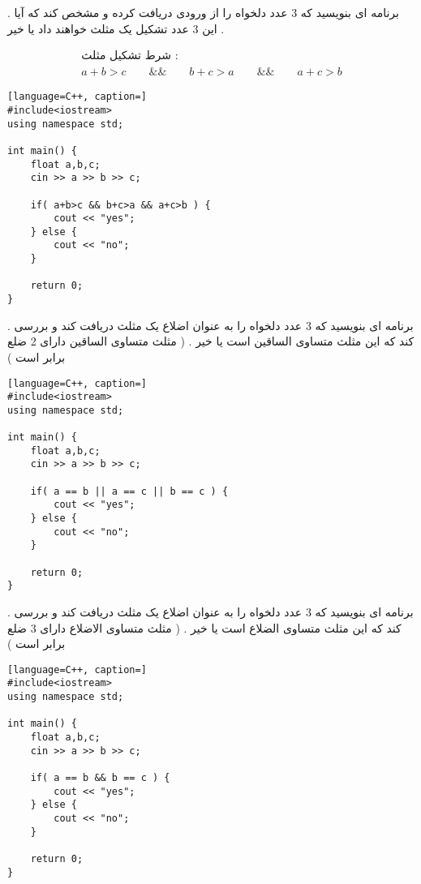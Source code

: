 \documentclass[12pt]{article}
\begin{document}
\newpage

 . برنامه ای بنویسید که 3 عدد دلخواه را از ورودی دریافت کرده و مشخص کند که آیا این 3 عدد تشکیل یک مثلث خواهند داد یا خیر .



\begin{align*}
\text{شرط تشکیل مثلث : } \\ 
a+b>c \qquad \&\& \qquad b+c>a \qquad \&\& \qquad a+c>b
\end{align*}




\begin{latin}
\begin{lstlisting}[language=C++, caption=]
#include<iostream>
using namespace std;

int main() {
	float a,b,c;
	cin >> a >> b >> c;
	
	if( a+b>c && b+c>a && a+c>b ) {
		cout << "yes";
	} else {
		cout << "no";
	}
	
	return 0;
}
\end{lstlisting}
\end{latin}




\newpage

 . برنامه ای بنویسید که 3 عدد دلخواه را به عنوان اضلاع یک مثلث دریافت کند و بررسی کند که این مثلث متساوی الساقین است یا خیر . ( مثلث متساوی الساقین دارای 2 ضلع برابر است )



\begin{latin}
\begin{lstlisting}[language=C++, caption=]
#include<iostream>
using namespace std;

int main() {
	float a,b,c;
	cin >> a >> b >> c;
	
	if( a == b || a == c || b == c ) {
		cout << "yes";
	} else {
		cout << "no";
	}
	
	return 0;
}
\end{lstlisting}
\end{latin}




\newpage

 . برنامه ای بنویسید که 3 عدد دلخواه را به عنوان اضلاع یک مثلث دریافت کند و بررسی کند که این مثلث متساوی الضلاع است یا خیر . ( مثلث متساوی الاضلاع دارای 3 ضلع برابر است )







\begin{latin}
\begin{lstlisting}[language=C++, caption=]
#include<iostream>
using namespace std;

int main() {
	float a,b,c;
	cin >> a >> b >> c;
	
	if( a == b && b == c ) {
		cout << "yes";
	} else {
		cout << "no";
	}
	
	return 0;
}
\end{lstlisting}
\end{latin}
\end{document}
